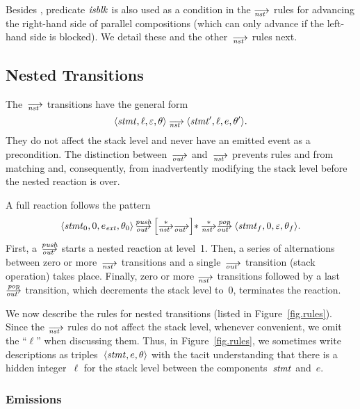 Besides , predicate $\mathop{\mathit{isblk}}$ is also used as a condition in the
$\nst$ rules for advancing the right-hand side of parallel compositions
(which can only advance if the left-hand side is blocked).  We detail these
and the other~$\nst$ rules next.




\subsection{Nested Transitions}
\label{sec.sem.nested}

The~$\nst$ transitions have the general form
\[
\<\stmt,\ell,\nil,\theta>\nst\<\stmt',\ell,e,\theta'>.
\]
They do not affect the stack level and never have an emitted event as a
precondition.  The distinction between~$\out$ and~$\nst$ prevents rules
 and  from matching and, consequently, from inadvertently
modifying the stack level before the nested reaction is over.

A full reaction follows the pattern
\begin{align*}
  \<\stmt_0,0,e_\ext,\theta_0>\outpush
  {\Big[{\nst[*]}{\out}\Big]{*}}
  \null\mathbin{\nst[*]\outpop}\<\stmt_f,0,\nil,\theta_f>.
\end{align*}
First, a~$\outpush$ starts a nested reaction at level~1.  Then, a series of
alternations between zero or more~$\nst$ transitions and a single~$\out$
transition (stack operation) takes place.  Finally, zero or more $\nst$
transitions followed by a last~$\outpop$ transition, which decrements the
stack level to~0, terminates the reaction.

We now describe the rules for nested transitions (listed in
Figure~\ref{fig.rules}).  Since the $\nst$ rules do not affect the stack
level, whenever convenient, we omit the ``$\ell$'' when discussing them.
Thus, in Figure~\ref{fig.rules}, we sometimes write descriptions as
triples~$\<\stmt,e,\theta>$ with the tacit understanding that there is a
hidden integer~$\ell$ for the stack level between the components~$\mathit{stmt}$
and~$e$.

\subsubsection*{Emissions}

